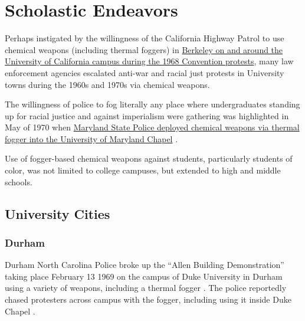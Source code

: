 \documentclass[
  11pt,
  titlepage]{krantz}
\begin{document}
\hypertarget{scholastic-endeavors}{%
\chapter*{Scholastic Endeavors}\label{scholastic-endeavors}}


Perhaps instigated by the willingness of the California Highway Patrol to use chemical weapons (including thermal foggers) in \protect\hyperlink{BerkeleyCA1968_08_31}{Berkeley on and around the University of California campus during the 1968 Convention protests}, many law enforcement agencies escalated anti-war and racial just protests in University towns during the 1960s and 1970s via chemical weapons.

The willingness of police to fog literally any place where undergraduates standing up for racial justice and against imperialism were gathering was highlighted in May of 1970 when \protect\hyperlink{CollegeParkMD1970_05_04}{Maryland State Police deployed chemical weapons via thermal fogger into the University of Maryland Chapel} \citep{Cabe1970}.

Use of fogger-based chemical weapons against students, particularly students of color, was not limited to college campuses, but extended to high and middle schools.

\hypertarget{university-cities}{%
\section*{University Cities}\label{university-cities}}


\hypertarget{durham}{%
\subsection*{Durham}\label{durham}}


Durham North Carolina Police broke up the ``Allen Building Demonstration'' taking place February 13 1969 on the campus of Duke University in Durham using a variety of weapons, including a thermal fogger \citep{DMH1969, Schreiberetal1971a, Schreiberetal1971b}.
The police reportedly chased protesters across campus with the fogger, including using it inside Duke Chapel \citep{Schreiberetal1971a, Schreiberetal1971b}.
\end{document}
